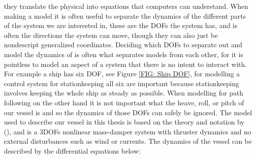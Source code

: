 they translate the physical into equations that computers can understand. When making a model it is often useful to separate the dynamics of the different parts of the 
system we are interested in, these are the \gls{DOF}s the system has, and is often the directions the system can move, though they can also just be
nondescript generalized coordinates. Deciding which \gls{DOF}s to separate out and model the dynamics of is often what separates models from each other, for it is pointless to model
an aspect of a system that there is no intent to interact with. For example a ship has six \gls{DOF}, see Figure \ref{FIG: Ship DOF}, for modelling a control system for stationkeeping
all six are important because stationkeeping involves keeping the whole ship as steady as possible. When modelling for path following on the other hand it is not
important what the heave, roll, or pitch of our vessel is and so the dynamics of those \gls{DOF}s can safely be ignored. 
The model used to describe our vessel in this thesis is based on the theory and notation by (\cite{fossen2011handbook}), and is a 3\gls{DOF}s nonlinear mass-damper system with
thruster dynamics and no external disturbances such as wind or currents. The dynamics of the vessel can be described by the differential equations below:

